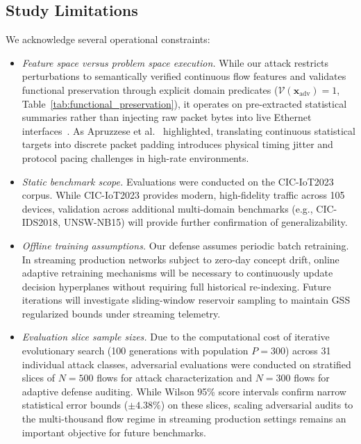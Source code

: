 \documentclass[iicol,pdflatex,sn-mathphys-num]{sn-jnl}
\begin{document}
\subsection{Study Limitations}
We acknowledge several operational constraints:
\begin{itemize}
    \item \textit{Feature space versus problem space execution.} While our attack restricts perturbations to semantically verified continuous flow features and validates functional preservation through explicit domain predicates ($\mathcal{V}(\mathbf{x}_{\text{adv}}) = 1$, Table~\ref{tab:functional_preservation}), it operates on pre-extracted statistical summaries rather than injecting raw packet bytes into live Ethernet interfaces~\cite{pierazzi2020intriguing,chernikova2023problem}. As Apruzzese et al.~\cite{apruzzese2023real} highlighted, translating continuous statistical targets into discrete packet padding introduces physical timing jitter and protocol pacing challenges in high-rate environments.
    \item \textit{Static benchmark scope.} Evaluations were conducted on the CIC-IoT2023 corpus. While CIC-IoT2023 provides modern, high-fidelity traffic across 105 devices, validation across additional multi-domain benchmarks (e.g., CIC-IDS2018, UNSW-NB15) will provide further confirmation of generalizability.
    \item \textit{Offline training assumptions.} Our defense assumes periodic batch retraining. In streaming production networks subject to zero-day concept drift, online adaptive retraining mechanisms will be necessary to continuously update decision hyperplanes without requiring full historical re-indexing. Future iterations will investigate sliding-window reservoir sampling to maintain GSS regularized bounds under streaming telemetry.
    \item \textit{Evaluation slice sample sizes.} Due to the computational cost of iterative evolutionary search (100 generations with population $P=300$) across 31 individual attack classes, adversarial evaluations were conducted on stratified slices of $N=500$ flows for attack characterization and $N=300$ flows for adaptive defense auditing. While Wilson 95\% score intervals confirm narrow statistical error bounds ($\pm 4.38\%$) on these slices, scaling adversarial audits to the multi-thousand flow regime in streaming production settings remains an important objective for future benchmarks.
\end{itemize}
\end{document}
